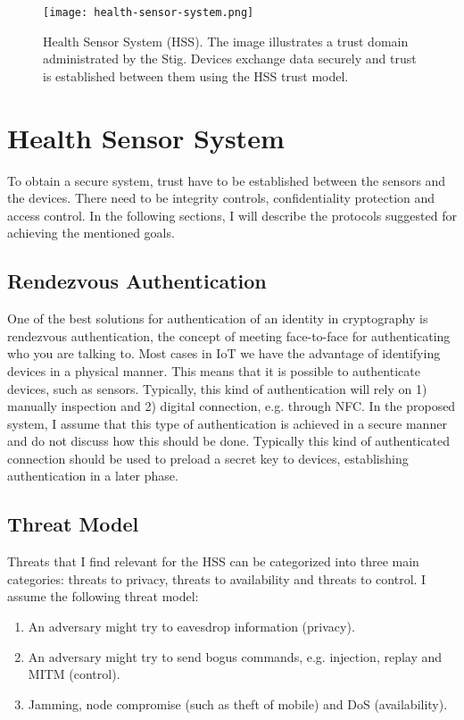 \begin{figure}[ht]
  \centering
  \texttt{[image: health-sensor-system.png]}
  \caption[Health Sensor System]{Health Sensor System (HSS). 
  The image illustrates a trust domain administrated by the Stig.
  Devices exchange data securely and trust is established between them using the HSS trust model.}
  \label{fig:health-sensor-system}
\end{figure}

\section{Health Sensor System}\label{hss}
To obtain a secure system, trust have to be established between the sensors and the devices.
There need to be integrity controls, confidentiality protection and access control. 
In the following sections, I will describe the protocols suggested for achieving the mentioned goals.

\subsection{Rendezvous Authentication}\label{rendezvous_authentication}
One of the best solutions for authentication of an identity in cryptography is rendezvous authentication, the concept of meeting face-to-face for authenticating who you are talking to. 
Most cases in \gls{IoT} we have the advantage of identifying devices in a physical manner.
This means that it is possible to authenticate devices, such as sensors. 
Typically, this kind of authentication will rely on 1) manually inspection and 2) digital connection, e.g. through \gls{NFC}.
In the proposed system, I assume that this type of authentication is achieved in a secure manner and do not discuss how this should be done.
Typically this kind of authenticated connection should be used to preload a secret key to devices, establishing authentication in a later phase.

\subsection{Threat Model}
Threats that I find relevant for the \gls{HSS} can be categorized into three main categories: threats to privacy, threats to availability and threats to control.
I assume the following threat model:
\begin{enumerate}
  \item An adversary might try to eavesdrop information (privacy).
  \item An adversary might try to send bogus commands, e.g. injection, replay and \gls{MITM} (control).
  \item Jamming, node compromise (such as theft of mobile) and \gls{DoS} (availability).
\end{enumerate}

